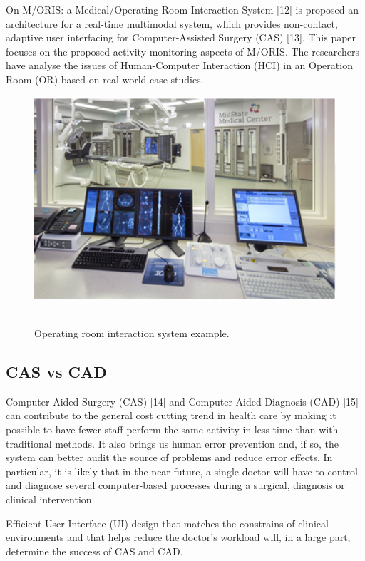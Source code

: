 On M/ORIS: a Medical/Operating Room Interaction System [12] is proposed an architecture for a real-time multimodal system, which provides non-contact, adaptive user interfacing for Computer-Assisted Surgery (CAS) [13]. This paper focuses on the proposed activity monitoring aspects of M/ORIS. The researchers have analyse the issues of Human-Computer Interaction (HCI) in an Operation Room (OR) based on real-world case studies.

\begin{figure}[!hbt]
\centering
\includegraphics[width=15cm]{images/moris}~\\
\caption{\label{fig:moris}Operating room interaction system example.
}
\end{figure}

\subsection{CAS vs CAD}

Computer Aided Surgery (CAS) [14] and Computer Aided Diagnosis (CAD) [15] can contribute to the general cost cutting trend in health care by making it possible to have fewer staff perform the same activity in less time than with traditional methods. It also brings us human error prevention and, if so, the system can better audit the source of problems and reduce error effects. In particular, it is likely that in the near future, a single doctor will have to control and diagnose several computer-based processes during a surgical, diagnosis or clinical intervention.

Efficient User Interface (UI) design that matches the constrains of clinical environments and that helps reduce the doctor's workload will, in a large part, determine the success of CAS and CAD.


